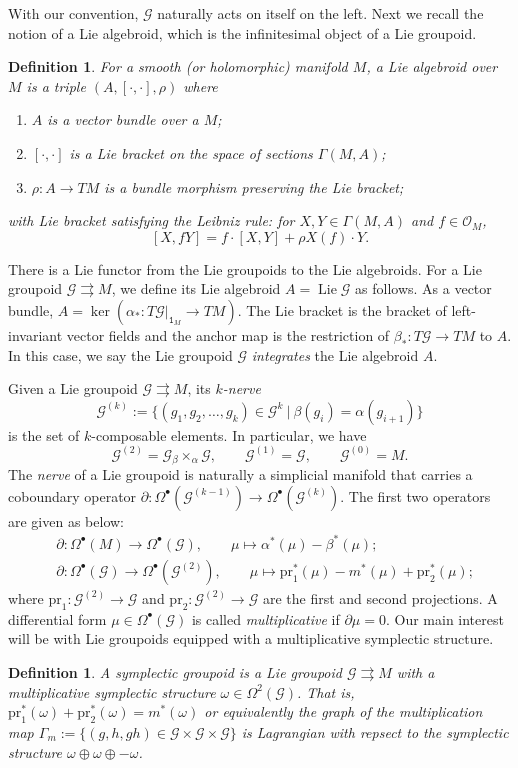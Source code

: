 \documentclass{amsart}
\newtheorem{definition}[theorem]{Definition}
\numberwithin{equation}{section}
\newcommand{\cG}{\mathcal{G}}
\newcommand{\cO}{\mathcal{O}}
\newcommand{\Lie}{\operatorname{Lie}}
\newcommand{\rra}{\rightrightarrows}
\begin{document}
With our convention, $\cG$ naturally acts on itself on the left.
Next we recall the notion of a Lie algebroid, which is the infinitesimal object of a Lie groupoid.
\begin{definition}
  For a smooth (or holomorphic) manifold $M$, a Lie algebroid over $M$ is a triple $(A, [\cdot, \cdot], \rho)$ where
  \begin{enumerate}
    \item $A$ is a vector bundle over a $M$;
    \item $[\cdot, \cdot]$ is a Lie bracket on the space of sections $\Gamma(M, A)$;
    \item $\rho: A \to TM$ is a bundle morphism preserving the Lie bracket;
  \end{enumerate}
  with Lie bracket satisfying the Leibniz rule: for $X, Y \in \Gamma(M, A)$ and $f \in \cO_M$,
  \[[X, fY] = f\cdot[X, Y] + \rho X(f) \cdot Y.\]
\end{definition}

There is a Lie functor from the Lie groupoids to the Lie algebroids.
For a Lie groupoid $\cG \rra M$, we define its Lie algebroid $A = \Lie \cG$ as follows.
As a vector bundle, $A = \ker \left(\alpha_*: T\cG|_{\mathtt{1}_M} \to TM \right)$.
The Lie bracket is the bracket of left-invariant vector fields and the anchor map is the restriction of $\beta_*: T\cG \to TM$ to $A$.
In this case, we say the Lie groupoid $\cG$ \emph{integrates} the Lie algebroid $A$.

Given a Lie groupoid $\cG \rra M$, its \emph{$k$-nerve}
\[
	\cG^{(k)} := \{(g_1, g_2, \ldots, g_k) \in \cG^k ~|~ \beta(g_i) = \alpha(g_{i+1})\}
\]
is the set of $k$-composable elements.
In particular, we have
\[\cG^{(2)} = \cG {_\beta \times_\alpha} \cG,\qquad \cG^{(1)} = \cG,\qquad \cG^{(0)} = M.\]
The \emph{nerve} of a Lie groupoid is naturally a simplicial manifold that carries a coboundary operator $\partial: \Omega^\bullet(\cG^{(k-1)}) \to \Omega^\bullet(\cG^{(k)})$.
The first two operators are given as below:
\begin{align} 
  \label{eq:gpdcob}
  & \partial: \Omega^\bullet(M) \to \Omega^\bullet(\cG), \qquad \mu \mapsto \alpha^*(\mu) - \beta^*(\mu); \\
  & \partial: \Omega^\bullet(\cG) \to \Omega^\bullet(\cG^{(2)}), \qquad \mu \mapsto \mathrm{pr}_1^*(\mu) - m^*(\mu) + \mathrm{pr}_2^*(\mu);
\end{align}
where $\mathrm{pr}_1: \cG^{(2)} \to \cG$ and $\mathrm{pr}_2: \cG^{(2)} \to \cG$ are the first and second projections.
A differential form $\mu \in \Omega^\bullet(\cG)$ is called \emph{multiplicative} if $\partial \mu = 0$.
Our main interest will be with Lie groupoids equipped with a multiplicative symplectic structure.
\begin{definition}
  A \emph{symplectic groupoid} is a Lie groupoid $\cG \rra M$ with a multiplicative symplectic structure $\omega \in \Omega^2(\cG)$.
  That is, $\mathrm{pr}_1^*(\omega)+\mathrm{pr}_2^*(\omega) = m^*(\omega)$ or equivalently the graph of the multiplication map $\Gamma_m := \{(g, h, gh) \in \cG \times \cG \times \cG\}$ is Lagrangian with repsect to the symplectic structure $\omega \oplus \omega \oplus -\omega$.
\end{definition}
\end{document}
